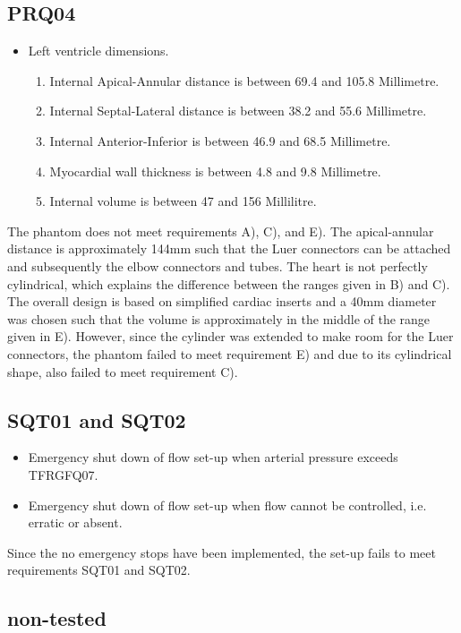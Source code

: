 \subsection*{PRQ04}
\begin{itemize}
	\item  Left ventricle dimensions.
	\begin{enumerate}[label=\Alph*, noitemsep]
		\item Internal Apical-Annular distance is between 69.4 and 105.8 Millimetre.
		\item Internal Septal-Lateral distance is between 38.2 and 55.6 Millimetre.
		\item Internal Anterior-Inferior is between 46.9 and 68.5 Millimetre.
		\item Myocardial wall thickness is between 4.8 and 9.8 Millimetre.
		\item Internal volume is between 47 and 156 Millilitre.
	\end{enumerate}
\end{itemize}
The phantom does not meet requirements A), C), and E). The apical-annular distance is approximately 144mm such that the Luer connectors can be attached and subsequently the elbow connectors and tubes. The heart is not perfectly cylindrical, which explains the difference between the ranges given in B) and C). The overall design is based on simplified cardiac inserts and a 40mm diameter was chosen such that the volume is approximately in the middle of the range given in E). However, since the cylinder was extended to make room for the Luer connectors, the phantom failed to meet requirement E) and due to its cylindrical shape, also failed to meet requirement C).

\subsection*{SQT01 and SQT02}
\begin{itemize}[noitemsep]
	\item Emergency shut down of flow set-up when arterial pressure exceeds TFRGFQ07.
	\item Emergency shut down of flow set-up when flow cannot be controlled, i.e. erratic or absent.
\end{itemize}
Since the no emergency stops have been implemented, the set-up fails to meet requirements SQT01 and SQT02. 


\subsection{non-tested}
